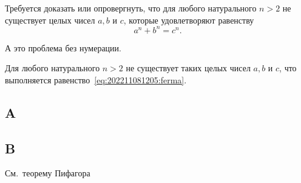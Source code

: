 \documentclass[example-notes.tex]{subfiles}
\begin{document}

    \begin{problem}
        \label{prlm:202211081205}
        Требуется доказать или опровергнуть, что для любого натурального $n>2$ не существует целых чисел $a,b$ и $c$, которые удовлетворяют равенству
        \begin{equation}
            \label{eq:202211081205:ferma}
            a^n+b^n=c^n.
        \end{equation}
    \end{problem}

    \begin{problem*}
        А это проблема без нумерации.
    \end{problem*}

    \begin{theorem}
        \label{thm:202211081205}
        Для любого натурального $n>2$ не существует таких целых чисел $a,b$ и $c$, что выполняется равенство~\eqref{eq:202211081205:ferma}.
    \end{theorem}

    \Blindtext

    \subsection{A}
    \label{subsec:202211081205:a}
    \Blindtext
    \begin{lemma}
        \label{lem:202211081205}
        \blindtext
    \end{lemma}

   \subsection{B}\label{subsec:202211081205:b}
    \Blindtext

    \seealso
    См.~теорему Пифагора~
\end{document}
